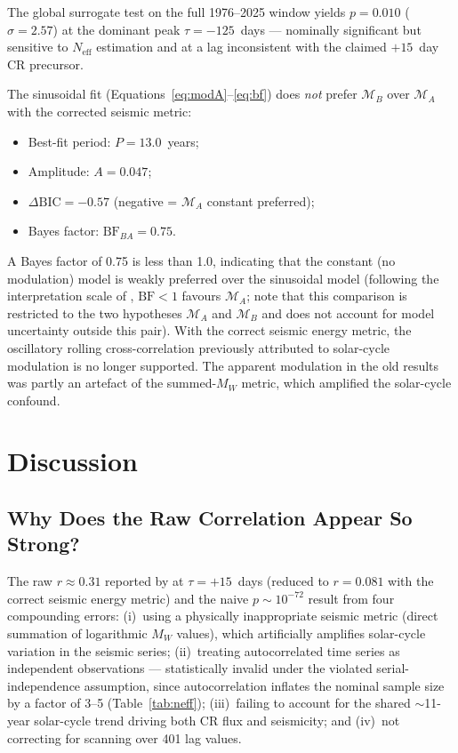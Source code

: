 \documentclass[12pt,a4paper]{article}
\begin{document}
The global surrogate test on the full 1976--2025 window yields $p = 0.010$
($\sigma = 2.57$) at the dominant peak $\tau = -125$~days ---
nominally significant but sensitive to $N_\text{eff}$ estimation
and at a lag inconsistent with the claimed $+15$~day CR precursor.

The sinusoidal fit (Equations~\ref{eq:modA}--\ref{eq:bf}) does \emph{not} prefer
$\mathcal{M}_B$ over $\mathcal{M}_A$ with the corrected seismic metric:
\begin{itemize}
  \item Best-fit period: $P = 13.0$~years;
  \item Amplitude: $A = 0.047$;
  \item $\Delta\text{BIC} = -0.57$ (negative = $\mathcal{M}_A$ constant preferred);
  \item Bayes factor: $\text{BF}_{BA} = 0.75$.
\end{itemize}

A Bayes factor of 0.75 is less than 1.0, indicating that the constant (no
modulation) model is weakly preferred over the sinusoidal model (following
the interpretation scale of \citet{KassRaftery1995}, $\text{BF} < 1$ favours
$\mathcal{M}_A$; note that this comparison is restricted to the two
hypotheses $\mathcal{M}_A$ and $\mathcal{M}_B$ and does not account for
model uncertainty outside this pair).
With the correct seismic energy metric, the oscillatory rolling cross-correlation
previously attributed to solar-cycle modulation is no longer supported.
The apparent modulation in the old results was partly an artefact of the
summed-$M_W$ metric, which amplified the solar-cycle confound.

\section{Discussion}
\label{sec:discussion}

\subsection{Why Does the Raw Correlation Appear So Strong?}

The raw $r \approx 0.31$ reported by \citet{Homola2023} at $\tau = +15$~days
(reduced to $r = 0.081$ with the correct seismic energy metric) and the naive
$p \sim 10^{-72}$ result from four compounding errors:
(i)~using a physically inappropriate seismic metric (direct summation of
logarithmic $M_W$ values), which artificially amplifies solar-cycle variation
in the seismic series;
(ii)~treating autocorrelated time series as independent observations ---
statistically invalid under the violated serial-independence assumption, since
autocorrelation inflates the nominal sample size by a factor of 3--5
(Table~\ref{tab:neff});
(iii)~failing to account for the shared $\sim$11-year solar-cycle trend driving
both CR flux and seismicity; and
(iv)~not correcting for scanning over 401 lag values.
\end{document}
